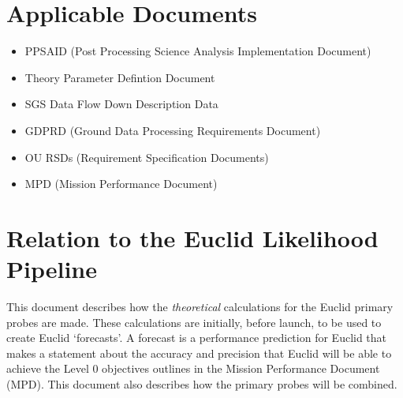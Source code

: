 \section*{Applicable Documents} 
\begin{itemize} 
\item 
PPSAID (Post Processing Science Analysis Implementation Document) 
\item 
Theory Parameter Defintion Document 
\item 
SGS Data Flow Down Description Data 
\item 
GDPRD (Ground Data Processing Requirements Document)
\item 
OU RSDs (Requirement Specification Documents)
\item 
MPD (Mission Performance Document) 
\end{itemize} 

\section{Relation to the Euclid Likelihood Pipeline} 
This document describes how the \emph{theoretical} calculations for the Euclid primary probes are made. 
These calculations are initially, before launch, to be used to create Euclid `forecasts'. A forecast 
is a performance prediction for Euclid that makes a statement about the accuracy and precision that Euclid 
will be able to achieve the Level 0 objectives outlines in the Mission Performance Document (MPD). 
This document also describes how the primary probes will be combined. 

